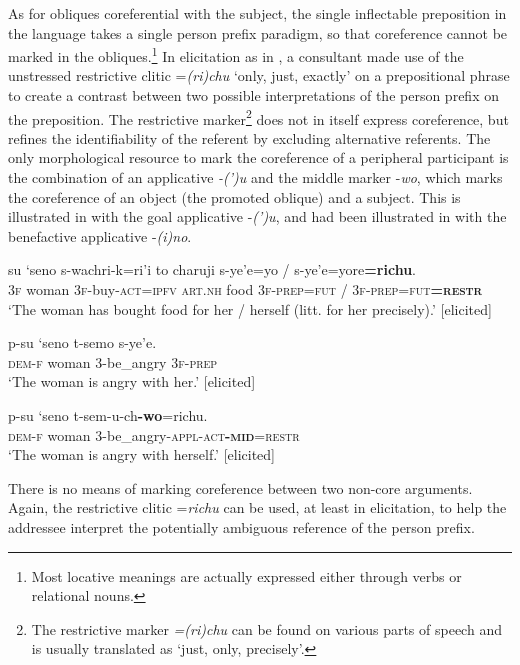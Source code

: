 \documentclass[output=paper]{langscibook}
\begin{document}
As for obliques coreferential with the subject, the single inflectable preposition in the language takes a single person prefix paradigm, so that coreference cannot be marked in the obliques.\footnote{Most locative meanings are actually expressed either through verbs or relational nouns.} In elicitation as in , a consultant made use of the unstressed restrictive clitic =\textit{(ri)chu} ‘only, just, exactly’ on a prepositional phrase to create a contrast between two possible interpretations of the person prefix on the preposition. The restrictive marker\footnote{The restrictive marker \textit{=(ri)chu} can be found on various parts of speech and is usually translated as ‘just, only, precisely’.} does not in itself express coreference, but refines the identifiability of the referent by excluding alternative referents. The only morphological resource to mark the coreference of a peripheral participant is the combination of an applicative \textit{-(')}\textit{u} and the middle marker -\textit{wo}, which marks the coreference of an object (the promoted oblique) and a subject. This is illustrated in  with the goal applicative -\textit{(')}\textit{u}, and had been illustrated in  with the benefactive applicative -\textit{(i)no}.


\ea
\label{ex:Rose:28}
\gll su `seno s-wachri-k=ri'i to charuji s-ye'e=yo / s-ye'e=yore\textbf{=richu}.\\
3\textsc{f} woman 3\textsc{f}-buy-\textsc{act=ipfv} \textsc{art.nh} food \textsc{3f-prep=fut} \textsc{/} \textsc{3f-prep=fut\textbf{=restr}}\\
\glt ‘‎The woman has bought food for her / herself (litt. for her precisely).’ [elicited]
\z

\ea
\label{ex:Rose:29}
\ea
\label{ex:Rose:29a}
\gll p-su `seno t-semo s-ye'e.\\
 \textsc{dem-f} woman 3-be\_angry \textsc{3f-prep}\\
\glt ‘The woman is angry with her.’ [elicited]

\ex
\label{ex:Rose:29b}
\gll p-su `seno t-sem-u-ch\textbf{-wo}=richu.\\
 \textsc{dem-f} woman 3-be\_angry\textsc{-appl-act\textbf{-mid}=restr}\\
\glt ‘The woman is angry with herself.’ [elicited]
\z
\z



There is no means of marking coreference between two non-core arguments. Again, the restrictive clitic =\textit{richu} can be used, at least in elicitation, to help the addressee interpret the potentially ambiguous reference of the person prefix.
\end{document}
